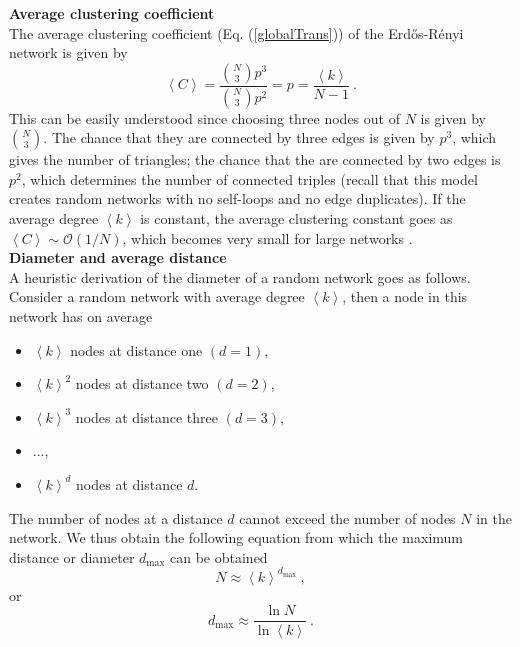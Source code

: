 \documentclass[11 pt , letterpaper , twoside , openright]{book}
\begin{document}
\textbf{Average clustering coefficient}\\
\newline
The average clustering coefficient (Eq. (\ref{globalTrans})) of the Erd\H{o}s-R\'{e}nyi network is given by \cite{Clauset2011}
\begin{equation}\label{C}
	\left<C\right> = \frac{\binom{N}{3}p^3}{\binom{N}{3}p^2} = p = \frac{\left<k\right>}{N-1} \ .
\end{equation}
This can be easily understood since choosing three nodes out of $N$ is given by $\binom{N}{3}$. The chance that they are connected by three edges is given by $p^3$, which gives the number of triangles; the chance that the are connected by two edges is $p^2$, which determines the number of connected triples (recall that this model creates random networks with no self-loops and no edge duplicates). If the average degree $\left<k\right>$ is constant, the average clustering constant goes as $\left<C\right> \sim \mathcal{O}(1/N)$, which becomes very small for large networks \cite{Clauset2011}. \\
\newline
\textbf{Diameter and average distance}\\
\newline
A heuristic derivation of the diameter of a random network goes as follows. Consider a random network with average degree $\left<k\right>$, then a node in this network has on average \cite{Albert2014}
\begin{itemize}
	\item $\left<k\right>$ nodes at distance one $(d=1)$,
	\item $\left<k\right>^2$ nodes at distance two $(d=2)$,
	\item $\left<k\right>^3$ nodes at distance three $(d=3)$,
	\item ...,
	\item $\left<k\right>^d$ nodes at distance $d$.
\end{itemize}
The number of nodes at a distance $d$ cannot exceed the number of nodes $N$ in the network. We thus obtain the following equation from which the maximum distance or diameter $d_{\textrm{max}}$ can be obtained
\begin{equation}
	N \approx \left<k\right>^{d_{\textrm{max}}} \ ,
\end{equation}
or 
\begin{equation}\label{diameter}
	d_{\textrm{max}} \approx \frac{\ln{N}}{\ln{\left<k\right>}} \ .
\end{equation}
\end{document}
